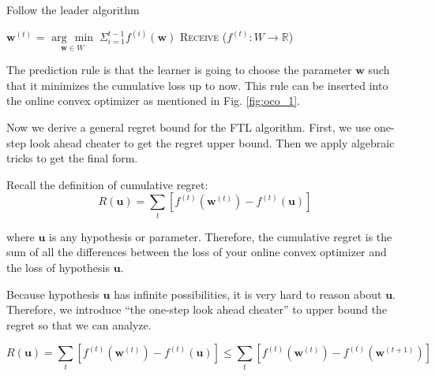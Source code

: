 \documentclass[11pt]{article}
\newcommand{\argmin}[1]{\underset{#1}{\operatorname{arg}\,\operatorname{min}}\;}
\begin{document}

\begin{algorithm}
  \caption{Follow the leader algorithm}\label{euclid}
  \begin{algorithmic}[1]
            \State $\bm{w}^{(t)}$ = $\argmin{\bm{w} \in W} \Sigma^{t-1}_{i=1} f^{(i)} (\bm{w})$ 
            \State \textsc{Receive} ($f^{(t)} : W \rightarrow \mathbb{R}$) 
        \EndFor
    \EndFunction
  \end{algorithmic}
\end{algorithm}


The prediction rule is that the learner is going to choose the parameter $\bm{w}$ such that it minimizes the cumulative loss up to now. This rule can be inserted into the online convex optimizer as mentioned in Fig. \ref{fig:oco_1}.

Now we derive a general regret bound for the FTL algorithm. First, we use one-step look ahead cheater to get the regret upper bound. Then we apply algebraic tricks to get the final form.

Recall the definition of cumulative regret:
\begin{equation}
    R(\bm{u}) = \sum_{t}[f^{(t)}(\bm{w}^{(t)}) - f^{(t)}(\bm{u})]
\end{equation}

where $\bm{u}$ is any hypothesis or parameter. Therefore, the cumulative regret is the sum of all the differences between the loss of your online convex optimizer and the loss of hypothesis $\bm{u}$.  

Because hypothesis $\bm{u}$ has infinite possibilities, it is very hard to reason about $\bm{u}$. Therefore, we introduce ``the one-step look ahead cheater'' to upper bound the regret so that we can analyze.   

\begin{equation}
    R(\bm{u}) = \sum_{t}[f^{(t)}(\bm{w}^{(t)}) - f^{(t)}(\bm{u})] \leq \sum_{t}[f^{(t)}(\bm{w}^{(t)}) - f^{(t)}(\bm{w}^{(t+1)})]
\end{equation}
\end{document}
